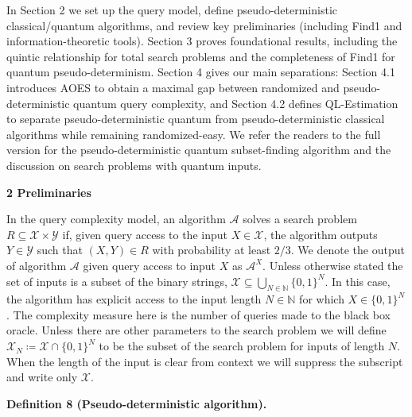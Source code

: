\documentclass[10pt,a4paper]{article}
\begin{document}
In Section 2 we set up the query model, define pseudo-deterministic classical/quantum algorithms, and review key preliminaries (including Find1 and information-theoretic tools). Section 3 proves foundational results, including the quintic relationship for total search problems and the completeness of Find1 for quantum pseudo-determinism. Section 4 gives our main separations: Section 4.1 introduces AOES to obtain a maximal gap between randomized and pseudo-deterministic quantum query complexity, and Section 4.2 defines QL-Estimation to separate pseudo-deterministic quantum from pseudo-deterministic classical algorithms while remaining randomized-easy. We refer the readers to the full version for the pseudo-deterministic quantum subset-finding algorithm and the discussion on search problems with quantum inputs.\par






\par\medskip\noindent\textbf{
2 Preliminaries}\par




In the query complexity model, an algorithm $\mathcal{A}$ solves a search problem ${R}\subseteq\mathcal{X}\times\mathcal{Y}$ if, given query access to the input $X\in\mathcal{X}$, the algorithm outputs $Y\in\mathcal{Y}$ such that $(X,Y)\in{R}$ with probability at least $2/3$. We denote the output of algorithm $\mathcal{A}$ given query access to input $X$ as $\mathcal{A}^{X}$.
Unless otherwise stated the set of inputs is a subset of the binary strings, $\mathcal{X}\subseteq\bigcup_{N\in\mathbb{N}}\{0,1\}^{N}$. In this case, the algorithm has explicit access to the input length $N\in\mathbb{N}$ for which $X\in\{0,1\}^{N}$. The complexity measure here is the number of queries made to the black box oracle. Unless there are other parameters to the search problem we will define $\mathcal{X}_{N}\coloneqq\mathcal{X}\cap\{0,1\}^{N}$ to be the subset of the search problem for inputs of length $N$. When the length of the input is clear from context we will suppress the subscript and write only $\mathcal{X}$.\par





\par\medskip\noindent\textbf{
\textbf{Definition 8}\textbf{ }(Pseudo-deterministic algorithm)\textbf{.}
}\par
\end{document}
